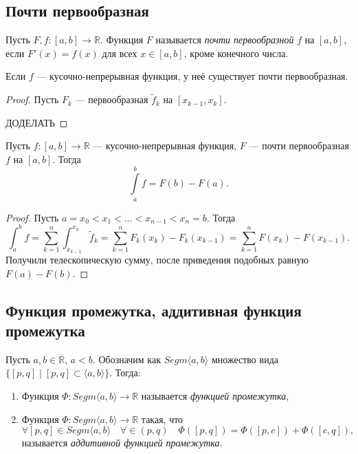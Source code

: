 \subsection{Почти первообразная}

\begin{definition}
	Пусть \(F, f \colon [a, b] \to \mathbb{R}\). Функция \(F\) называется \textit{почти первообразной} \(f\) на \([a, b]\), если \(F'(x) = f(x)\) для всех \(x \in [a, b]\), кроме конечного числа.
\end{definition}

\begin{nremark}
	Если \(f\) --- кусочно-непрерывная функция, у неё существует почти первообразная.
\end{nremark}
\begin{proof}
	Пусть \(F_k\) --- первообразная \(\widetilde{f}_k\) на \([x_{k - 1}, x_k]\).
	
	ДОДЕЛАТЬ
\end{proof}

\begin{nremark}
	Пусть \(f \colon [a, b] \to \mathbb{R}\) --- кусочно-непрерывная функция, \(F\) --- почти первообразная \(f\) на \([a, b]\). Тогда \[
		\int\limits_a^b f = F(b) - F(a).
	\]
\end{nremark}
\begin{proof}
	Пусть \(a = x_0 < x_1 < \ldots < x_{n - 1} < x_n = b\). Тогда \[
		\int_a^b f = \sum_{k = 1}^n \int_{x_{k - 1}}^{x_k} \widetilde{f}_k = \sum_{k = 1}^n F_k(x_k) - F_k (x_{k - 1}) = \sum_{k = 1}^n F(x_k) - F(x_{k - 1}).
	\]
	Получили телескопическую сумму, после приведения подобных равную \(F(a) - F(b)\).
\end{proof}

\subsection{Функция промежутка, аддитивная функция промежутка}

\begin{definition}
	Пусть \(a, b \in \overline{\mathbb{R}}\), \(a < b\). Обозначим как \(Segm \langle a, b \rangle\) множество вида \(\{[p, q] \mid [p, q] \subset \langle a, b \rangle\}\). Тогда:
	\begin{enumerate}
		\item Функция \(\Phi \colon Segm \langle a, b \rangle \to \mathbb{R}\) называется \textit{функцией промежутка},
		\item Функция \(\Phi \colon Segm \langle a, b \rangle \to \mathbb{R}\) такая, что \[
			\forall [p, q] \in Segm \langle a, b \rangle \quad \forall \in (p, q) \quad \Phi([p, q]) = \Phi([p, c]) + \Phi([c, q]),
		\]
		называется \textit{аддитивной функцией промежутка}.
	\end{enumerate}
\end{definition}

